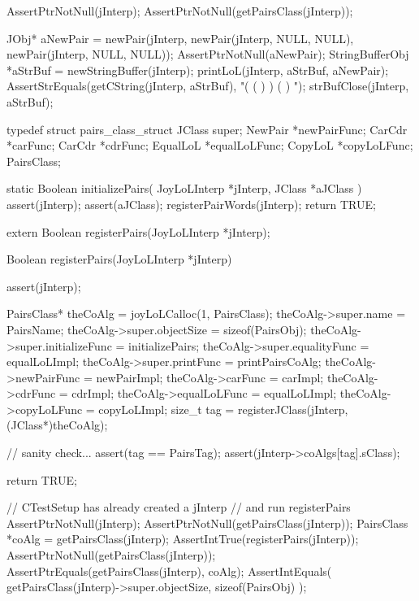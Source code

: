 
\startCTest
  AssertPtrNotNull(jInterp);
  AssertPtrNotNull(getPairsClass(jInterp));

  JObj* aNewPair = newPair(jInterp,
                               newPair(jInterp, NULL, NULL),
                               newPair(jInterp, NULL, NULL));
  AssertPtrNotNull(aNewPair);
  StringBufferObj *aStrBuf = newStringBuffer(jInterp);
  printLoL(jInterp, aStrBuf, aNewPair);
  AssertStrEquals(getCString(jInterp, aStrBuf), "( ( ) ) ( ) ");
  strBufClose(jInterp, aStrBuf);
\stopCTest
\stopTestCase
\stopTestSuite

\startTestSuite[registerPairs]

\startCHeader
typedef struct pairs_class_struct {
  JClass  super;
  NewPair    *newPairFunc;
  CarCdr     *carFunc;
  CarCdr     *cdrFunc;
  EqualLoL   *equalLoLFunc;
  CopyLoL    *copyLoLFunc;
} PairsClass;
\stopCHeader

\startCCode
static Boolean initializePairs(
  JoyLoLInterp *jInterp,
  JClass   *aJClass
) {
  assert(jInterp);
  assert(aJClass);
  registerPairWords(jInterp);
  return TRUE;
}
\stopCCode

\startCHeader
extern Boolean registerPairs(JoyLoLInterp *jInterp);
\stopCHeader
{}

\startCCode
Boolean registerPairs(JoyLoLInterp *jInterp) {
  assert(jInterp);
  
  PairsClass* theCoAlg           = joyLoLCalloc(1, PairsClass);
  theCoAlg->super.name           = PairsName;
  theCoAlg->super.objectSize     = sizeof(PairsObj);
  theCoAlg->super.initializeFunc = initializePairs;
  theCoAlg->super.equalityFunc   = equalLoLImpl;
  theCoAlg->super.printFunc      = printPairsCoAlg;
  theCoAlg->newPairFunc          = newPairImpl;
  theCoAlg->carFunc              = carImpl;
  theCoAlg->cdrFunc              = cdrImpl;
  theCoAlg->equalLoLFunc         = equalLoLImpl;
  theCoAlg->copyLoLFunc          = copyLoLImpl;
  size_t tag =
    registerJClass(jInterp, (JClass*)theCoAlg);
  
  // sanity check...
  assert(tag == PairsTag);
  assert(jInterp->coAlgs[tag].sClass);

  return TRUE;
}
\stopCCode


\startCTest
  // CTestSetup has already created a jInterp
  // and run registerPairs
  AssertPtrNotNull(jInterp);
  AssertPtrNotNull(getPairsClass(jInterp));
  PairsClass *coAlg = getPairsClass(jInterp);
  AssertIntTrue(registerPairs(jInterp));
  AssertPtrNotNull(getPairsClass(jInterp));
  AssertPtrEquals(getPairsClass(jInterp), coAlg);
  AssertIntEquals(
    getPairsClass(jInterp)->super.objectSize,
    sizeof(PairsObj)
  );
\stopCTest
\stopTestCase
\stopTestSuite


